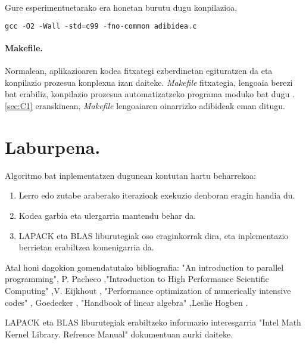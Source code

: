 Gure esperimentuetarako era honetan burutu dugu konpilazioa,
\begin{lstlisting}[language=C]
gcc -O2 -Wall -std=c99 -fno-common adibidea.c
\end{lstlisting}

\paragraph*{Makefile.}

Normalean, aplikazioaren kodea fitxategi ezberdinetan egituratzen da eta konpilazio prozesua konplexua izan daiteke. \emph{Makefile} fitxategia, lengoaia berezi bat erabiliz, konpilazio prozesua automatizatzeko programa moduko bat dugu \cite{EijkhoutHPC}. \ref{sec:C1} eranskinean, \emph{Makefile} lengoaiaren oinarrizko adibideak eman ditugu.

\section{Laburpena.}

Algoritmo bat inplementatzen dugunean kontutan hartu beharrekoa:

\begin{enumerate}

\item Lerro edo zutabe araberako iterazioak exekuzio denboran eragin handia du.

\item Kodea garbia eta ulergarria mantendu behar da.

\item LAPACK eta BLAS liburutegiak oso eraginkorrak dira, eta inplementazio berrietan erabiltzea komenigarria da.


\end{enumerate}

Atal honi dagokion gomendatutako bibliografia:  
"An introduction to parallel programming", P. Pacheco \cite{Pacheco2011},"Introduction to High Performance Scientific Computing" ,V. Eijkhout \cite{EijkhoutHPC}, "Performance optimization of numerically intensive codes" , Goedecker \cite{Goedecker2001}, "Handbook of linear algebra" ,Leslie Hogben \cite{Hogben2013}.

LAPACK eta BLAS liburutegiak erabiltzeko informazio interesgarria "Intel Math Kernel Library. Refrence Manual" \cite{Intel2015} dokumentuan aurki daiteke.
